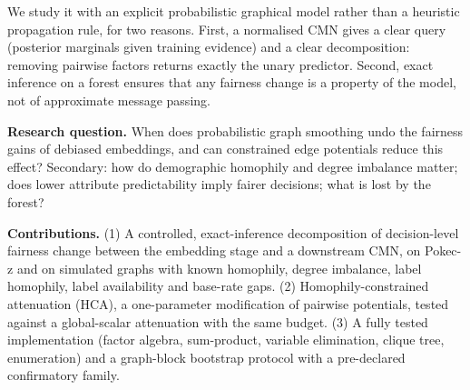 \documentclass[11pt,a4paper]{article}
\begin{document}
We study it with an explicit probabilistic graphical model rather than a heuristic propagation rule, for two reasons. First, a normalised CMN gives a clear query (posterior marginals given training evidence) and a clear decomposition: removing pairwise factors returns exactly the unary predictor. Second, exact inference on a forest ensures that any fairness change is a property of the model, not of approximate message passing.

\textbf{Research question.} When does probabilistic graph smoothing undo the fairness gains of debiased embeddings, and can constrained edge potentials reduce this effect? Secondary: how do demographic homophily and degree imbalance matter; does lower attribute predictability imply fairer decisions; what is lost by the forest?

\textbf{Contributions.} (1) A controlled, exact-inference decomposition of decision-level fairness change between the embedding stage and a downstream CMN, on Pokec-z and on simulated graphs with known homophily, degree imbalance, label homophily, label availability and base-rate gaps. (2) Homophily-constrained attenuation (HCA), a one-parameter modification of pairwise potentials, tested against a global-scalar attenuation with the same budget. (3) A fully tested implementation (factor algebra, sum-product, variable elimination, clique tree, enumeration) and a graph-block bootstrap protocol with a pre-declared confirmatory family.
\end{document}
